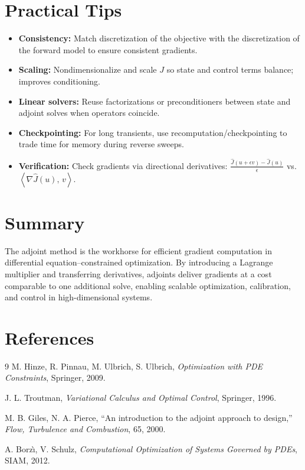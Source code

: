 \documentclass[11pt,a4paper]{article}
\numberwithin{equation}{section}
\theoremstyle{plain}
\theoremstyle{definition}
\newcommand{\ip}[2]{\left\langle #1,\,#2 \right\rangle}
\begin{document}
\section{Practical Tips}
\begin{itemize}
  \item \textbf{Consistency:} Match discretization of the objective with the discretization of the forward model to ensure consistent gradients.
  \item \textbf{Scaling:} Nondimensionalize and scale $J$ so state and control terms balance; improves conditioning.
  \item \textbf{Linear solvers:} Reuse factorizations or preconditioners between state and adjoint solves when operators coincide.
  \item \textbf{Checkpointing:} For long transients, use recomputation/checkpointing to trade time for memory during reverse sweeps.
  \item \textbf{Verification:} Check gradients via directional derivatives: $\frac{\hat J(u+\epsilon v)-\hat J(u)}{\epsilon}$ vs. $\ip{\nabla \hat J(u)}{v}{}$.
\end{itemize}

\section{Summary}
The adjoint method is the workhorse for efficient gradient computation in differential equation–constrained optimization. By introducing a Lagrange multiplier and transferring derivatives, adjoints deliver gradients at a cost comparable to one additional solve, enabling scalable optimization, calibration, and control in high-dimensional systems.

\section*{References}
\begin{thebibliography}{9}
M. Hinze, R. Pinnau, M. Ulbrich, S. Ulbrich, \emph{Optimization with PDE Constraints}, Springer, 2009.

J. L. Troutman, \emph{Variational Calculus and Optimal Control}, Springer, 1996.

M. B. Giles, N. A. Pierce, ``An introduction to the adjoint approach to design,'' \emph{Flow, Turbulence and Combustion}, 65, 2000.

A. Borz\`{\i}, V. Schulz, \emph{Computational Optimization of Systems Governed by PDEs}, SIAM, 2012.
\end{thebibliography}
\end{document}

